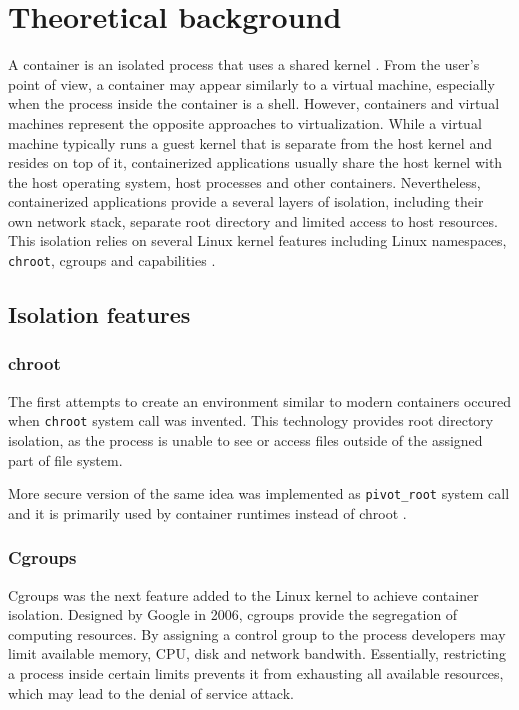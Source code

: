 \section{Theoretical background}

A container is an isolated process that uses a shared kernel \cite{1}. From the user's point of view, a container may appear similarly to a virtual machine, especially when the process inside the container is a shell. However, containers and virtual machines represent the opposite approaches to virtualization. While a virtual machine typically runs a guest kernel that is separate from the host kernel and resides on top of it, containerized applications usually share the host kernel with the host operating system, host processes and other containers. Nevertheless, containerized applications provide a several layers of isolation, including their own network stack, separate root directory and limited access to host resources. This isolation relies on several Linux kernel features including Linux namespaces, \texttt{chroot}, cgroups and capabilities \cite{b:rice}.

\subsection{Isolation features}

\subsubsection{chroot}

The first attempts to create an environment similar to modern containers occured when \texttt{chroot} system call was invented. This technology provides root directory isolation, as the process is unable to see or access files outside of the assigned part of file system.

More secure version of the same idea was implemented as \texttt{pivot\_root} system call and it is primarily used by container runtimes instead of chroot \cite{b:rice}.

\subsubsection{Cgroups}

Cgroups was the next feature added to the Linux kernel to achieve container isolation. Designed by Google in 2006, cgroups provide the segregation of computing resources. By assigning a control group to the process developers may limit available memory, CPU, disk and network bandwith. Essentially, restricting a process inside certain limits prevents it from exhausting all available resources, which may lead to the denial of service attack.

